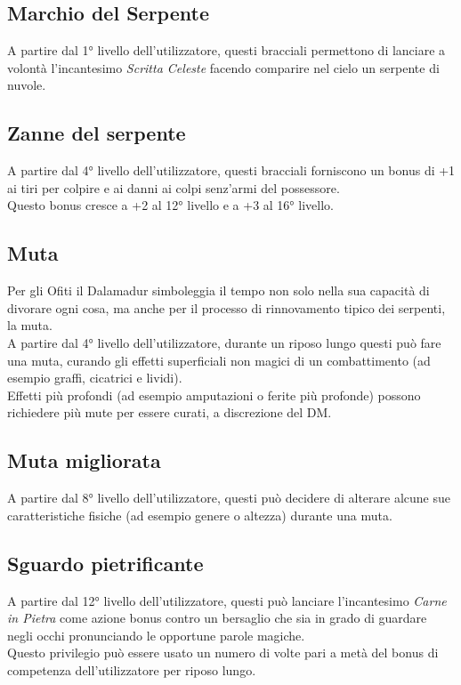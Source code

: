 \documentclass[letterpaper,twocolumn,openany,nodeprecatedcode]{dndbook}
\begin{document}
\subsection{Marchio del Serpente}
A partire dal 1° livello dell'utilizzatore, questi bracciali permettono di lanciare a volontà l'incantesimo \textit{Scritta Celeste} facendo comparire nel cielo un serpente di nuvole.

\subsection{Zanne del serpente}
A partire dal 4° livello dell'utilizzatore, questi bracciali forniscono un bonus di +1 ai tiri per colpire e ai danni ai colpi senz'armi del possessore.\\
Questo bonus cresce a +2 al 12° livello e a +3 al 16° livello.

\subsection{Muta}
Per gli Ofiti il Dalamadur simboleggia il tempo non solo nella sua capacità di divorare ogni cosa, ma anche per il processo di rinnovamento tipico dei serpenti, la muta.\\
A partire dal 4° livello dell'utilizzatore, durante un riposo lungo questi può fare una muta, curando gli effetti superficiali non magici di un combattimento (ad esempio graffi, cicatrici e lividi).\\
Effetti più profondi (ad esempio amputazioni o ferite più profonde) possono richiedere più mute per essere curati, a discrezione del DM.

\subsection{Muta migliorata}
A partire dal 8° livello dell'utilizzatore, questi può decidere di alterare alcune sue caratteristiche fisiche (ad esempio genere o altezza) durante una muta.

\subsection{Sguardo pietrificante}
A partire dal 12° livello dell'utilizzatore, questi può lanciare l'incantesimo \textit{Carne in Pietra} come azione bonus contro un bersaglio che sia in grado di guardare negli occhi pronunciando le opportune parole magiche.\\
Questo privilegio può essere usato un numero di volte pari a metà del bonus di competenza dell'utilizzatore per riposo lungo.
\end{document}
